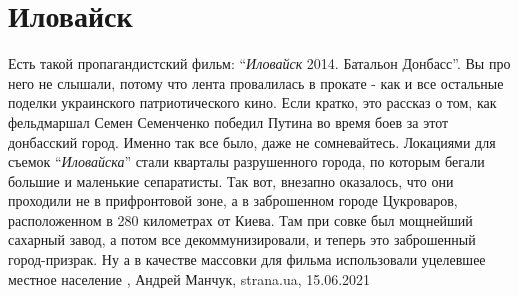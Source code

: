  
 
 
 
 
\chapter{Иловайск}
\label{sec:slova.ilovajsk}

Есть такой пропагандистский фильм: \enquote{\emph{Иловайск} 2014. Батальон
Донбасс}. Вы про него не слышали, потому что лента провалилась в прокате - как
и все остальные поделки украинского патриотического кино. Если кратко, это
рассказ о том, как фельдмаршал Семен Семенченко победил Путина во время боев за
этот донбасский город. Именно так все было, даже не сомневайтесь.  Локациями
для съемок \enquote{\emph{Иловайска}} стали кварталы разрушенного города, по
которым бегали большие и маленькие сепаратисты. Так вот, внезапно оказалось,
что они проходили не в прифронтовой зоне, а в заброшенном городе Цукроваров,
расположенном в 280 километрах от Киева. Там при совке был мощнейший сахарный
завод, а потом все декоммунизировали, и теперь это заброшенный город-призрак.
Ну а в качестве массовки для фильма использовали уцелевшее местное население
, 
Андрей Манчук, strana.ua, 15.06.2021

